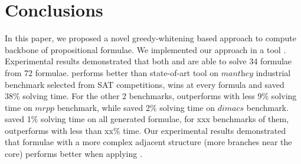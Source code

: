 \section{Conclusions}\label{sec:conc}



In this paper, we proposed a novel greedy-whitening based approach \tool to compute backbone of propositional formulae.
We implemented our approach in a tool \tool. Experimental results demonstrated that both \tool and \minibones are able to solve 34 formulae from 72 formulae. 
\tool performs better than state-of-art tool \minibones on $\textit{manthey}$ industrial benchmark selected from SAT competitions, wins at every formula and saved 38\% solving time. For the other 2 benchmarks, \minibones outperforms \tool with less 9\% solving time on $\textit{mrpp}$ benchmark, while \tool saved 2\% solving time on $\textit{dimacs}$ benchmark. \tool saved 1\% solving time on all generated formulae, for xxx benchmarks of them, \tool outperforms \minibones with less than xx\% time.
Our experimental results demonstrated that formulae with a more complex adjacent structure (more branches near the core) performs better when applying \tool.



